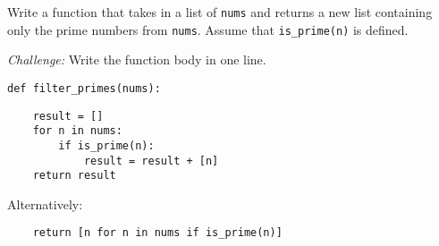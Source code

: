 \begin{blocksection}
\question Write a function that takes in a list of \lstinline$nums$ and returns a new list containing only the prime numbers from \lstinline$nums$. Assume that \lstinline$is_prime(n)$ is defined.

\emph{Challenge:} Write the function body in one line.

\begin{lstlisting}
def filter_primes(nums):
\end{lstlisting}

\begin{solution}[2in]
\begin{lstlisting}
    result = []
    for n in nums:
        if is_prime(n):
            result = result + [n]
    return result
\end{lstlisting}

Alternatively:

\begin{lstlisting}
    return [n for n in nums if is_prime(n)]
\end{lstlisting}
\end{solution}
\end{blocksection}
